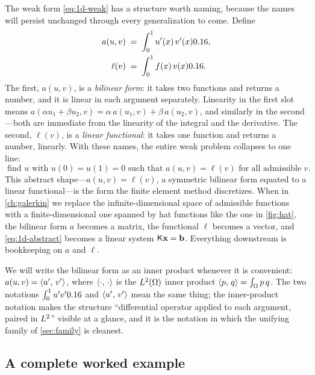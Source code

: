 The weak form \cref{eq:1d-weak} has a structure worth naming, because the names
will persist unchanged through every generalization to come. Define
\begin{align}
  a(u,v) &\;=\; \int_0^1 u'(x)\,v'(x)0.16, \label{eq:1d-bilinear}\\
  \ell(v) &\;=\; \int_0^1 f(x)\,v(x)0.16. \label{eq:1d-linear}
\end{align}
The first, $a(u,v)$, is a \emph{bilinear form}: it takes two functions and
returns a number, and it is linear in each argument separately. Linearity in
the first slot means $a(\alpha u_1 + \beta u_2, v) = \alpha\,a(u_1,v) +
\beta\,a(u_2,v)$, and similarly in the second---both are immediate from the
linearity of the integral and the derivative. The second, $\ell(v)$, is a
\emph{linear functional}: it takes one function and returns a number, linearly.
With these names, the entire weak problem collapses to one line:
\begin{equation}
  \boxed{\;\text{find } u \text{ with } u(0)=u(1)=0 \text{ such that } a(u,v)=\ell(v) \text{ for all admissible } v.\;}
  \label{eq:1d-abstract}
\end{equation}
This abstract shape---$a(u,v) = \ell(v)$, a symmetric bilinear form equated to a
linear functional---is the form the finite element method discretizes. When in
\cref{ch:galerkin} we replace the infinite-dimensional space of admissible
functions with a finite-dimensional one spanned by hat functions like the one in
\cref{fig:hat}, the bilinear form $a$ becomes a matrix, the functional $\ell$
becomes a vector, and \cref{eq:1d-abstract} becomes a linear system $\mathsf{K}\mathbf{x}
= \mathbf{b}$. Everything downstream is bookkeeping on $a$ and $\ell$.

\begin{notationbox}
We will write the bilinear form as an inner product whenever it is convenient:
$a(u,v) = \left\langle u',\, v'\right\rangle$, where $\left\langle \cdot,\, \cdot\right\rangle$ is the $L^2(\Omega)$
inner product $\left\langle p,\, q\right\rangle = \int_\Omega p\,q$. The two notations
$\int_0^1 u'v'0.16$ and $\left\langle u',\, v'\right\rangle$ mean the same thing; the inner-product
notation makes the structure ``differential operator applied to each argument,
paired in $L^2$'' visible at a glance, and it is the notation in which the
unifying family of \cref{sec:family} is cleanest.
\end{notationbox}

\subsection{A complete worked example}

